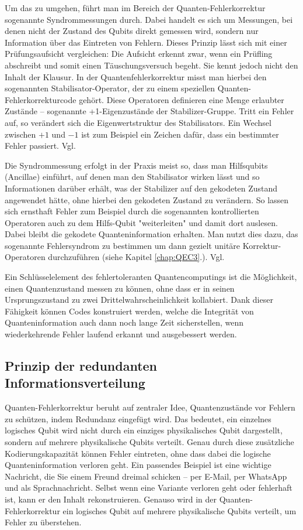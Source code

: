 Um das zu umgehen, führt man im Bereich der Quanten-Fehlerkorrektur sogenannte Syndrommessungen durch. Dabei handelt es sich um Messungen, bei denen nicht der Zustand des Qubits direkt gemessen wird, sondern nur Information über das Eintreten von Fehlern. Dieses Prinzip lässt sich mit einer Prüfungsaufsicht vergleichen: Die Aufsicht erkennt zwar, wenn ein Prüfling abschreibt und somit einen Täuschungsversuch begeht. Sie kennt jedoch nicht den Inhalt der Klausur. In der Quantenfehlerkorrektur misst man hierbei den sogenannten Stabilisator-Operator, der zu einem speziellen Quanten-Fehlerkorrekturcode gehört. Diese Operatoren definieren eine Menge erlaubter Zustände – sogenannte +1-Eigenzustände der Stabilizer-Gruppe. Tritt ein Fehler auf, so verändert sich die Eigenwertstruktur des Stabilisators. Ein Wechsel zwischen \(+1\) und \(-1\) ist zum Beispiel ein  Zeichen dafür, dass ein bestimmter Fehler passiert. Vgl. \cite[Seite 444-446]{nielsen_quantum_2010}

Die Syndrommessung erfolgt in der Praxis meist so, dass man Hilfsqubits (Ancillae) einführt, auf denen man den Stabilisator wirken lässt und so Informationen darüber erhält, was der Stabilizer auf den gekodeten Zustand angewendet hätte, ohne hierbei den gekodeten Zustand zu verändern. So lassen sich ernsthaft Fehler zum Beispiel durch die sogenannten kontrollierten Operatoren auch zu dem Hilfs-Qubit "weiterleiten" und damit dort auslesen. Dabei bleibt die gekodete Quanteninformation erhalten. Man nutzt dies dazu, das sogenannte Fehlersyndrom zu bestimmen um dann gezielt unitäre Korrektur-Operatoren durchzuführen (siehe Kapitel \ref{chap:QEC3}.). Vgl. \cite[Seite 444-446]{nielsen_quantum_2010}

Ein Schlüsselelement des fehlertoleranten Quantencomputings ist die Möglichkeit, einen Quantenzustand messen zu können, ohne dass er in seinen Ursprungszustand zu zwei Drittelwahrscheinlichkeit kollabiert. Dank dieser Fähigkeit können Codes konstruiert werden, welche die Integrität von Quanteninformation auch dann noch lange Zeit sicherstellen, wenn wiederkehrende Fehler laufend erkannt und ausgebessert werden.

\subsection{Prinzip der redundanten Informationsverteilung}
Quanten-Fehlerkorrektur beruht auf zentraler Idee, Quantenzustände vor Fehlern zu schützen, indem Redundanz eingefügt wird. Das bedeutet, ein einzelnes logisches Qubit wird nicht durch ein einziges physikalisches Qubit dargestellt, sondern auf mehrere physikalische Qubits verteilt. Genau durch diese zusätzliche Kodierungskapazität können Fehler eintreten, ohne dass dabei die logische Quanteninformation verloren geht. Ein passendes Beispiel ist eine wichtige Nachricht, die Sie einem Freund dreimal schicken – per E-Mail, per WhatsApp und als Sprachnachricht. Selbst wenn eine Variante verloren geht oder fehlerhaft ist, kann er den Inhalt rekonstruieren. Genauso wird in der Quanten-Fehlerkorrektur ein logisches Qubit auf mehrere physikalische Qubits verteilt, um Fehler zu überstehen.

